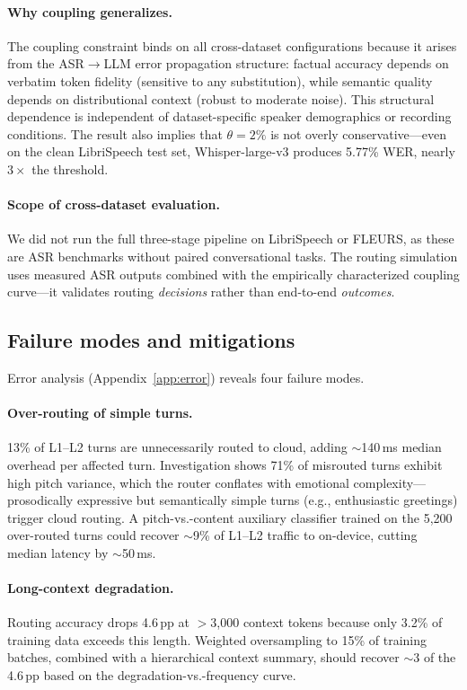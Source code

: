 \documentclass{article}
\begin{document}
\paragraph{Why coupling generalizes.}
The coupling constraint binds on all cross-dataset configurations because it arises from the ASR$\to$LLM error propagation structure: factual accuracy depends on verbatim token fidelity (sensitive to any substitution), while semantic quality depends on distributional context (robust to moderate noise). This structural dependence is independent of dataset-specific speaker demographics or recording conditions. The result also implies that $\theta=2\%$ is not overly conservative---even on the clean LibriSpeech test set, Whisper-large-v3 produces 5.77\% WER, nearly $3\times$ the threshold.

\paragraph{Scope of cross-dataset evaluation.}
We did not run the full three-stage pipeline on LibriSpeech or FLEURS, as these are ASR benchmarks without paired conversational tasks. The routing simulation uses measured ASR outputs combined with the empirically characterized coupling curve---it validates routing \emph{decisions} rather than end-to-end \emph{outcomes}.

\subsection{Failure modes and mitigations}
\label{sec:failure_modes}

Error analysis (Appendix~\ref{app:error}) reveals four failure modes.

\paragraph{Over-routing of simple turns.}
13\% of L1--L2 turns are unnecessarily routed to cloud, adding ${\sim}$140\,ms median overhead per affected turn. Investigation shows 71\% of misrouted turns exhibit high pitch variance, which the router conflates with emotional complexity---prosodically expressive but semantically simple turns (e.g., enthusiastic greetings) trigger cloud routing. A pitch-vs.-content auxiliary classifier trained on the 5{,}200 over-routed turns could recover ${\sim}$9\% of L1--L2 traffic to on-device, cutting median latency by ${\sim}$50\,ms.

\paragraph{Long-context degradation.}
Routing accuracy drops 4.6\,pp at $>$3{,}000 context tokens because only 3.2\% of training data exceeds this length. Weighted oversampling to 15\% of training batches, combined with a hierarchical context summary, should recover ${\sim}$3 of the 4.6\,pp based on the degradation-vs.-frequency curve.
\end{document}
